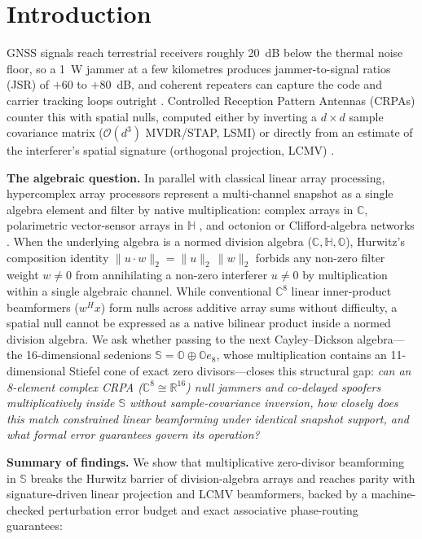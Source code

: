 \section{Introduction}

GNSS signals reach terrestrial receivers roughly 20~dB below the thermal noise floor, so a
1~W jammer at a few kilometres produces jammer-to-signal ratios (JSR) of $+60$ to $+80$~dB,
and coherent repeaters can capture the code and carrier tracking loops outright
\cite{borio2012,psiaki2016}. Controlled Reception Pattern Antennas (CRPAs) counter this with
spatial nulls, computed either by inverting a $d\times d$ sample covariance matrix
($\mathcal{O}(d^3)$ MVDR/STAP, LSMI) or directly from an estimate of the interferer's spatial
signature (orthogonal projection, LCMV) \cite{vantrees2002,compton1988}.

\textbf{The algebraic question.} In parallel with classical linear array processing,
hypercomplex array processors represent a multi-channel snapshot as a single algebra element
and filter by native multiplication: complex arrays in $\mathbb{C}$, polarimetric vector-sensor
arrays in $\mathbb{H}$ \cite{lebihan2004}, and octonion or Clifford-algebra networks
\cite{ji2026}. When the underlying algebra is a normed division algebra
($\mathbb{C},\mathbb{H},\mathbb{O}$), Hurwitz's composition identity
$\|u\cdot w\|_2 = \|u\|_2\,\|w\|_2$ forbids any non-zero filter weight $w\neq 0$ from
annihilating a non-zero interferer $u\neq 0$ by multiplication within a single algebraic
channel. While conventional $\mathbb{C}^8$ linear inner-product beamformers ($w^H x$) form
nulls across additive array sums without difficulty, a spatial null cannot be expressed as a
native bilinear product inside a normed division algebra. We ask whether passing to the next
Cayley--Dickson algebra—the 16-dimensional sedenions
$\mathbb{S}=\mathbb{O}\oplus\mathbb{O}e_8$, whose multiplication contains an 11-dimensional
Stiefel cone of exact zero divisors—closes this structural gap: \emph{can an 8-element complex
CRPA ($\mathbb{C}^8\cong\mathbb{R}^{16}$) null jammers and co-delayed spoofers
multiplicatively inside $\mathbb{S}$ without sample-covariance inversion, how closely does
this match constrained linear beamforming under identical snapshot support, and what formal
error guarantees govern its operation?}

\textbf{Summary of findings.} We show that multiplicative zero-divisor beamforming in
$\mathbb{S}$ breaks the Hurwitz barrier of division-algebra arrays and reaches parity with
signature-driven linear projection and LCMV beamformers, backed by a machine-checked
perturbation error budget and exact associative phase-routing guarantees:

